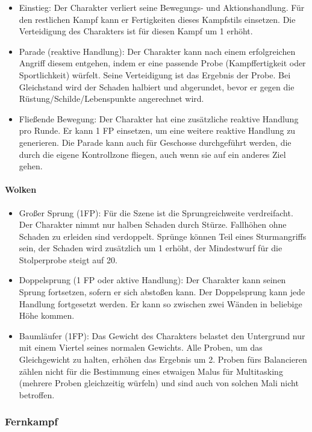 \documentclass{article}
\begin{document}
\begin{itemize}
\item Einstieg: Der Charakter verliert seine Bewegungs- und Aktionshandlung. Für den restlichen Kampf kann er Fertigkeiten dieses Kampfstils einsetzen. Die Verteidigung des Charakters ist für diesen Kampf um 1 erhöht.
\item Parade (reaktive Handlung): Der Charakter kann nach einem erfolgreichen Angriff diesem entgehen, indem er eine passende Probe (Kampffertigkeit oder Sportlichkeit) würfelt. Seine Verteidigung ist das Ergebnis der Probe. Bei Gleichstand wird der Schaden halbiert und abgerundet, bevor er gegen die Rüstung/Schilde/Lebenspunkte angerechnet wird.
\item Fließende Bewegung: Der Charakter hat eine zusätzliche reaktive Handlung pro Runde. Er kann 1 FP einsetzen, um eine weitere reaktive Handlung zu generieren. Die Parade kann auch für Geschosse durchgeführt werden, die durch die eigene Kontrollzone fliegen, auch wenn sie auf ein anderes Ziel gehen.
\end{itemize}

\paragraph{Wolken}

\begin{itemize}
\item Großer Sprung (1FP): Für die Szene ist die Sprungreichweite verdreifacht. Der Charakter nimmt nur halben Schaden durch Stürze. Fallhöhen ohne Schaden zu erleiden sind verdoppelt. Sprünge können Teil eines Sturmangriffs sein, der Schaden wird zusätzlich um 1 erhöht, der Mindestwurf für die Stolperprobe steigt auf 20.
\item Doppelsprung (1 FP oder aktive Handlung): Der Charakter kann seinen Sprung fortsetzen, sofern er sich abstoßen kann. Der Doppelsprung kann jede Handlung fortgesetzt werden. Er kann so zwischen zwei Wänden in beliebige Höhe kommen.
\item Baumläufer (1FP): Das Gewicht des Charakters belastet den Untergrund nur mit einem Viertel seines normalen Gewichts. Alle Proben, um das Gleichgewicht zu halten, erhöhen das Ergebnis um 2. Proben fürs Balancieren zählen nicht für die Bestimmung eines etwaigen Malus für Multitasking (mehrere Proben gleichzeitig würfeln) und sind auch von solchen Mali nicht betroffen.
\end{itemize}

\subsubsection{Fernkampf}
\end{document}
